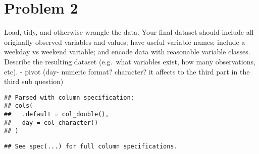 \documentclass[]{article}
\newenvironment{Shaded}{\begin{snugshade}}{\end{snugshade}}
\newcommand{\KeywordTok}[1]{\textcolor[rgb]{0.13,0.29,0.53}{\textbf{#1}}}
\newcommand{\NormalTok}[1]{#1}
\newcommand{\OperatorTok}[1]{\textcolor[rgb]{0.81,0.36,0.00}{\textbf{#1}}}
\newcommand{\StringTok}[1]{\textcolor[rgb]{0.31,0.60,0.02}{#1}}
\begin{document}
\hypertarget{problem-2}{%
\section{Problem 2}\label{problem-2}}

Load, tidy, and otherwise wrangle the data. Your final dataset should
include all originally observed variables and values; have useful
variable names; include a weekday vs weekend variable; and encode data
with reasonable variable classes. Describe the resulting dataset
(e.g.~what variables exist, how many observations, etc). - pivot (day-
numeric format? character? it affects to the third part in the third sub
question)

\begin{Shaded}
\end{Shaded}

\begin{verbatim}
## Parsed with column specification:
## cols(
##   .default = col_double(),
##   day = col_character()
## )
\end{verbatim}

\begin{verbatim}
## See spec(...) for full column specifications.
\end{verbatim}
\end{document}
